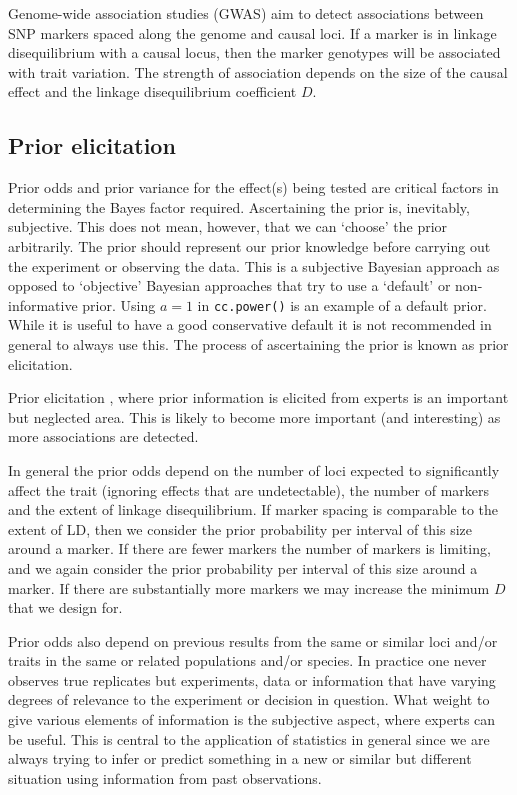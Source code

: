 \documentclass[a4paper,10pt]{amsart}
\begin{document}
Genome-wide association studies (GWAS) aim to detect associations
between SNP markers spaced along the genome and causal loci. If a
marker is in linkage disequilibrium with a causal locus, then the
marker genotypes will be associated with trait variation. The strength
of association depends on the size of the causal effect and the
linkage disequilibrium coefficient $D$.

\subsection{Prior elicitation}

Prior odds and prior variance for the effect(s) being tested are
critical factors in determining the Bayes factor
required.  Ascertaining the prior is, inevitably, subjective. This
does not mean, however, that we can `choose' the prior
arbitrarily. The prior should represent our prior knowledge before
carrying out the experiment or observing the data. This is a subjective
Bayesian approach as opposed to `objective' Bayesian approaches that 
try to use a `default' or non-informative prior. Using $a=1$ in
\texttt{cc.power()} is an example of a default prior. While it is useful
to have a good conservative default it is not recommended in general to always
use this. The process of ascertaining the prior is known as prior elicitation.

Prior elicitation \citep{OHagan2006prior_elicitation_book},
where prior information is elicited from experts is an important but neglected
area. This is likely to become more important (and interesting) as
more associations are detected.

In general the prior odds depend on the number of loci expected to
significantly affect the trait (ignoring effects that are
undetectable), the number of markers and the extent of linkage
disequilibrium.  If marker spacing is comparable to the extent of LD,
then we consider the prior probability per interval of this size
around a marker.  If there are fewer markers the number of markers is
limiting, and we again consider the prior probability per interval of
this size around a marker.  If there are substantially more markers we
may increase the minimum $D$ that we design for.

Prior odds also depend on previous results from the same or similar
loci and/or traits in the same or related populations and/or species.
In practice one never observes true replicates but experiments, data
or information that have varying degrees of relevance to the
experiment or decision in question. What weight to give various
elements of information is the subjective aspect, where experts can be
useful. This is central to the application of statistics in general
since we are always trying to infer or predict something in a new or
similar but different situation using information from past
observations.
\end{document}

